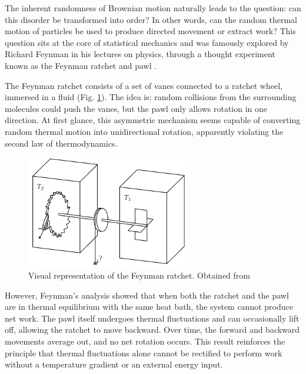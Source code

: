 The inherent randomness of Brownian motion naturally leads to the question: can this disorder be transformed into order? In other words, can the random thermal motion of particles be used to produce directed movement or extract work? This question sits at the core of statistical mechanics and was famously explored by Richard Feynman in his lectures on physics, through a thought experiment known as the Feynman ratchet and pawl \cite{feynman1963feynman}.

The Feynman ratchet consists of a set of vanes connected to a ratchet wheel, immersed in a fluid (Fig. \ref{fig:feynmanratchet}). The idea is: random collisions from the surrounding molecules could push the vanes, but the pawl only allows rotation in one direction. At first glance, this asymmetric mechanism seems capable of converting random thermal motion into unidirectional rotation, apparently violating the second law of thermodynamics.

\begin{figure}
  \begin{center}
    \includegraphics[width=0.65\textwidth]{figures/feynmanratchet.png}
  \end{center}
  \caption[Feynman ratchet]{Visual representation of the Feynman ratchet. Obtained from \cite{feynman1963feynman}}\label{fig:feynmanratchet}
\end{figure}


However, Feynman's analysis showed that when both the ratchet and the pawl are in thermal equilibrium with the same heat bath, the system cannot produce net work. The pawl itself undergoes thermal fluctuations and can occasionally lift off, allowing the ratchet to move backward. Over time, the forward and backward movements average out, and no net rotation occurs. This result reinforces the principle that thermal fluctuations alone cannot be rectified to perform work without a temperature gradient or an external energy input.

